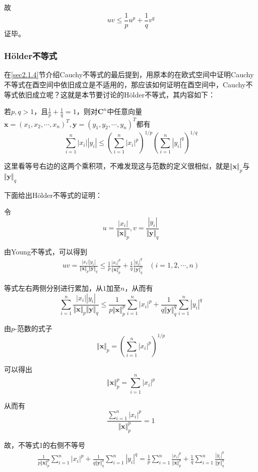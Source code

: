 \documentclass[12pt, a4paper, oneside, UTF8]{ctexbook}
\begin{document}
故\[
uv\leq\frac{1}{p}u^p+\frac{1}{q}v^q 
\]
证毕。
\subsubsection{Hölder不等式}
在\ref{sec2.1.4}节介绍Cauchy不等式的最后提到，用原本的在欧式空间中证明Cauchy不等式在酉空间中依旧成立是不适用的，那应该如何证明在酉空间中，Cauchy不等式依旧成立呢？这就是本节要讨论的Hölder不等式，其内容如下：

若$p,q>1$，且$\frac{1}{p}+\frac{1}{q}=1$，则对$\boldsymbol{C}^n$中任意向量$\boldsymbol{x}=(x_1,x_2,\cdots,x_n)^T, \boldsymbol{y}=(y_1,y_2,\cdots,y_n)^T$都有
\[
\sum\limits_{i=1}^n|x_i||y_i|\leq(\sum\limits_{i=1}^n|x_i|^p)^{1/p}(\sum\limits_{i=1}^n|y_i|^q)^{1/q}
\]

这里看等号右边的这两个乘积项，不难发现这与范数的定义很相似，就是$\Vert \boldsymbol{x}\Vert_p$与$\Vert \boldsymbol{y}\Vert_q$

下面给出Hölder不等式的证明：

令\[u=\frac{|x_i|}{\Vert \boldsymbol{x}\Vert_p},v=\frac{|y_i|}{\Vert \boldsymbol{y}\Vert_q} \]

由Young不等式，可以得到
\[
\begin{aligned}
    uv=\frac{|x_i||y_i|}{\Vert \boldsymbol{x}\Vert_p \Vert \boldsymbol{y}\Vert_q}\leq
    \frac{1}{p}\frac{|x_i|^p}{\Vert \boldsymbol{x}\Vert_p^p}+\frac{1}{q}\frac{|y_i|^q}{\Vert \boldsymbol{y}\Vert_q^q}\ \ \ \ (i=1,2,\cdots,n)
\end{aligned}
\]

等式左右两侧分别进行累加，从$1$加至$n$，从而有
\[
\sum\limits_{i=1}^n\frac{|x_i||y_i|}{\Vert \boldsymbol{x}\Vert_p \Vert \boldsymbol{y}\Vert_q}\leq\frac{1}{p\Vert \boldsymbol{x}\Vert_p^p}\sum\limits_{i=1}^n|x_i|^p+\frac{1}{q\Vert \boldsymbol{y}\Vert_q^q}\sum\limits_{i=1}^n|y_i|^q\tag{1}
\]

由$p$-范数的式子\[
\Vert \boldsymbol{x}\Vert_p=\left(\sum_{i=1}^n|x_i|^p\right)^{1/p}
\]

可以得出\[
\Vert \boldsymbol{x}\Vert_p^p=\sum_{i=1}^n|x_i|^p
\]

从而有
\[\frac{\sum\limits_{i=1}^n|x_i|^p}{\Vert \boldsymbol{x}\Vert_p^p}=1\tag{2}\]

故，不等式1的右侧不等号
\[
\begin{aligned}
\frac{1}{p\Vert \boldsymbol{x}\Vert_p^p}\sum\limits_{i=1}^n|x_i|^p+\frac{1}{q\Vert \boldsymbol{y}\Vert_q^q}\sum\limits_{i=1}^n|y_i|^q=\frac{1}{p}\sum\limits_{i=1}^n\frac{|x_i|^p}{\Vert \boldsymbol{x}\Vert_p^p}
+\frac{1}{q}\sum\limits_{i=1}^n\frac{|y_i|^q}{\Vert \boldsymbol{y}\Vert_q^q}
\end{aligned}\tag{3}
\]
\end{document}
